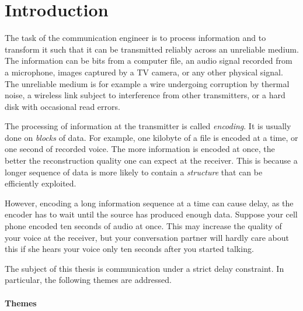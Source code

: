\chapter*{Introduction}

\nocite{KleinerR2009}
The task of the communication engineer is to process information and to
transform it such that it can be transmitted reliably across an unreliable
medium. The information can be bits from a computer file, an audio signal
recorded from a microphone, images captured by a TV camera, or any other
physical signal. The unreliable medium is for example a wire undergoing
corruption by thermal noise, a wireless link subject to interference from other
transmitters, or a hard disk with occasional read errors.

The processing of information at the transmitter is called \emph{encoding}. It
is usually done on \emph{blocks} of data. For example, one kilobyte of a file is
encoded at a time, or one second of recorded voice. The more information is
encoded at once, the better the reconstruction quality one can expect at the
receiver. This is because a longer sequence of data is more likely to contain a
\emph{structure} that can be efficiently exploited. 

However, encoding a long information sequence at a time can cause delay, as the
encoder has to wait until the source has produced enough data. Suppose your cell
phone encoded ten seconds of audio at once. This may increase the quality of
your voice at the receiver, but your conversation partner will hardly care about
this if she hears your voice only ten seconds after you started talking.  

The subject of this thesis is communication under a strict delay constraint. In
particular, the following themes are addressed. 

\subsubsection{Themes}

